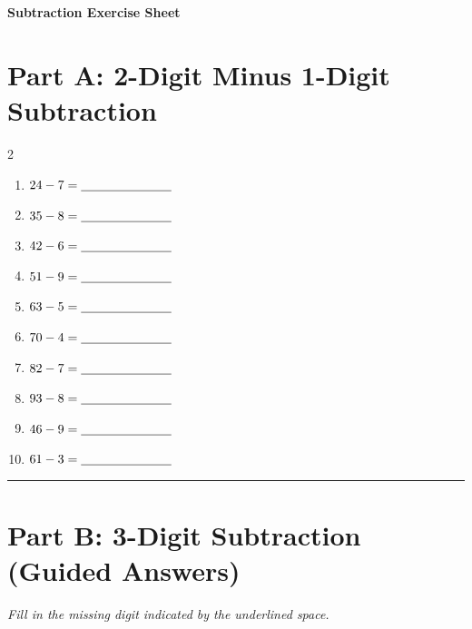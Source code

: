 \documentclass{article}
\begin{document}
\sffamily

\begin{center}
  {\Huge \bfseries Subtraction Exercise Sheet} \\[0.4em]
\end{center}
\vspace{1em}

\section*{Part A: 2-Digit Minus 1-Digit Subtraction}
\vspace{0.5em}

\begin{multicols}{2}
\begin{enumerate}[label=\textbf{\arabic*.}, itemsep=1.5em, leftmargin=2em]
  \item $24 - 7 = \underline{\hspace{2.5cm}}$
  \item $35 - 8 = \underline{\hspace{2.5cm}}$
  \item $42 - 6 = \underline{\hspace{2.5cm}}$
  \item $51 - 9 = \underline{\hspace{2.5cm}}$
  \item $63 - 5 = \underline{\hspace{2.5cm}}$
  \item $70 - 4 = \underline{\hspace{2.5cm}}$
  \item $82 - 7 = \underline{\hspace{2.5cm}}$
  \item $93 - 8 = \underline{\hspace{2.5cm}}$
  \item $46 - 9 = \underline{\hspace{2.5cm}}$
  \item $61 - 3 = \underline{\hspace{2.5cm}}$
\end{enumerate}
\end{multicols}

\vspace{1em}
\noindent\textcolor{subtext!40}{\rule{\linewidth}{0.5pt}}
\vspace{1em}

\section*{Part B: 3-Digit Subtraction (Guided Answers)}
\vspace{0.2em}
\noindent\textit{Fill in the missing digit indicated by the underlined space.}
\vspace{0.8em}
\end{document}
